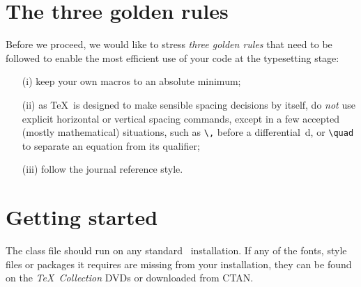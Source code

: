 \documentclass[Afour,sageh,times,doublespace]{sagej}
\begin{document}
\section{The three golden rules}
Before we proceed, we would like to stress \textit{three golden
rules} that need to be followed to enable the most efficient use
of your code at the typesetting stage:
\begin{enumerate}
\item[(i)] keep your own macros to an absolute minimum;

\item[(ii)] as \TeX\ is designed to make sensible spacing
decisions by itself, do \textit{not} use explicit horizontal or
vertical spacing commands, except in a few accepted (mostly
mathematical) situations, such as \verb"\," before a
differential~d, or \verb"\quad" to separate an equation from its
qualifier;

\item[(iii)] follow the journal reference style.
\end{enumerate}

\section{Getting started} The \textsf{\journalclassshort} class file should run
on any standard \LaTeXe\ installation. If any of the fonts, style
files or packages it requires are missing from your installation,
they can be found on the \textit{\TeX\ Collection} DVDs or downloaded from
CTAN.
\end{document}
